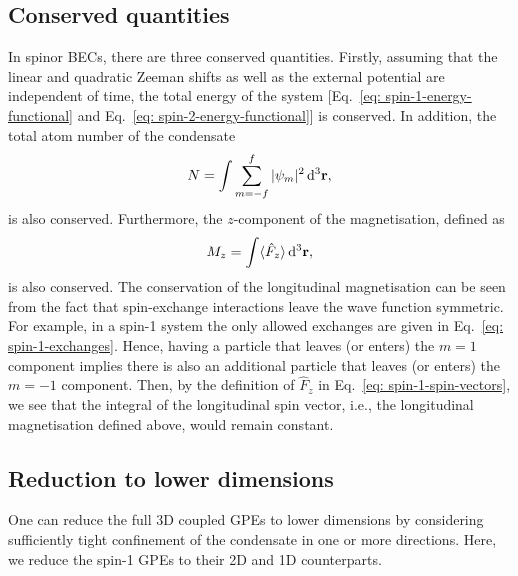\subsection{Conserved quantities}\label{subsec: conserved-quantities}
In spinor BECs, there are three conserved quantities.
Firstly, assuming that the linear and quadratic Zeeman shifts as well as the
external potential are independent of time, the total energy of the system
[Eq.~\eqref{eq: spin-1-energy-functional} and
Eq.~\eqref{eq: spin-2-energy-functional}] is conserved.
In addition, the total atom number of the condensate
\begin{align}
    N = \int \sum_{m=-f}^f |\psi_m|^2 \, \dd^3\vb{r},
\end{align}
is also conserved.
Furthermore, the \(z\)-component of the magnetisation, defined as
\begin{align}\label{eq: magnetisation-formula}
    M_z = \int \langle\hat{F}_z\rangle \, \dd^3\vb{r},
\end{align}
is also conserved.
The conservation of the longitudinal magnetisation can be seen from the fact
that spin-exchange interactions leave the wave function symmetric.
For example, in a spin-1 system the only allowed exchanges are given in
Eq.~\eqref{eq: spin-1-exchanges}.
Hence, having a particle that leaves (or enters) the \(m=1\) component implies
there is also an additional particle that leaves (or enters) the \(m=-1\)
component.
Then, by the definition of \(\hat{F}_z\) in Eq.~\eqref{eq: spin-1-spin-vectors},
we see that the integral of the longitudinal spin vector, i.e., the longitudinal
magnetisation defined above, would remain constant.

\subsection{Reduction to lower dimensions}
One can reduce the full 3D coupled GPEs to lower dimensions by considering
sufficiently tight confinement of the condensate in one or more directions.
Here, we reduce the spin-1 GPEs to their 2D and 1D counterparts.

